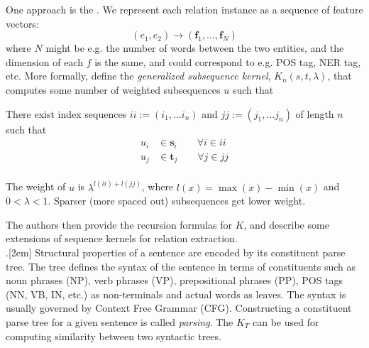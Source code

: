 \documentclass[11pt]{article}
\renewcommand\vec[2][]{\bm{#2}_{#1}}
\begin{document}
One approach is the . We represent each relation instance as a sequence of feature vectors:
$$
	(e_1, e_2) \rightarrow (\vec[1]{f}, \ldots, \vec[N]{f})
$$
where $N$ might be e.g. the number of words between the two entities, and the dimension of each $f$ is the same, and could correspond to e.g. POS tag, NER tag, etc. More formally, define the \textit{generalized subsequence kernel}, $K_n(s, t, \lambda)$, that computes some number of weighted subsequences $u$ such that
\begin{compactitem}
	\item There exist index sequences $ii := (i_1, \ldots i_n)$ and $jj := (j_1, \ldots j_n)$ of length $n$ such that 
	\begin{align}
		u_i &\in \vec[i]{s} \qquad \forall i \in  ii \\
		u_j &\in \vec[j]{t} \qquad \forall j \in jj \\ 
	\end{align}
	
	\item The weight of $u$ is $\lambda^{l(ii) + l(jj)}$, where $l(x) = \max(x) - \min(x)$ and $0 < \lambda < 1$. Sparser (more spaced out) subsequences get lower weight.
\end{compactitem}
The authors then provide the recursion formulas for $K$, and describe some extensions of sequence kernels for relation extraction.\\


.[2em] Structural properties of a sentence are encoded by its constituent parse tree. The tree defines the syntax of the sentence in terms of constituents such as noun phrases (NP), verb phrases (VP), prepositional phrases (PP), POS tags (NN, VB, IN, etc.) as non-terminals and actual words as leaves. The syntax is usually governed by Context Free Grammar (CFG). Constructing a constituent parse tree for a given sentence is called \textit{parsing}. The  $K_T$ can be used for computing similarity between two syntactic trees.\\
\end{document}
